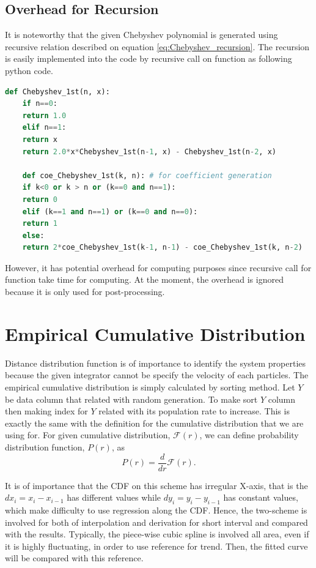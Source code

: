 \documentclass[10pt, a4paper]{article}
\begin{document}
\begin{appendices}
  \subsection{Overhead for Recursion}
  It is noteworthy that the given Chebyshev polynomial is generated using recursive relation described on equation \eqref{eq:Chebyshev_recursion}. The recursion is easily implemented into the code by recursive call on function as following python code.

  \begin{lstlisting}[language=Python, frame=single]
    def Chebyshev_1st(n, x): 
    if n==0:
    return 1.0
    elif n==1:
    return x
    return 2.0*x*Chebyshev_1st(n-1, x) - Chebyshev_1st(n-2, x)

    def coe_Chebyshev_1st(k, n): # for coefficient generation
    if k<0 or k > n or (k==0 and n==1):
    return 0
    elif (k==1 and n==1) or (k==0 and n==0):
    return 1
    else:
    return 2*coe_Chebyshev_1st(k-1, n-1) - coe_Chebyshev_1st(k, n-2)
  \end{lstlisting}

  However, it has potential overhead for computing purposes since recursive call for function take time for computing. At the moment, the overhead is ignored because it is only used for post-processing. 


  \section{Empirical Cumulative Distribution}\label{appen_distance_distribution}
  Distance distribution function is of importance to identify the system properties because the given integrator cannot be specify the velocity of each particles. The empirical cumulative distribution is simply calculated by sorting method. Let $Y$ be data column that related with random generation. To make sort $Y$ column then making index for $Y$ related with its population rate to increase. This is exactly the same with the definition for the cumulative distribution that we are using for. For given cumulative distribution, $\mathscr{F}(r)$, we can define probability distribution function, $P(r)$, as
  \begin{equation}
    P(r) = \frac{d}{dr}\mathscr{F}(r).
  \end{equation}

  It is of importance that the CDF on this scheme has irregular X-axis, that is the $dx_i = x_i - x_{i-1}$ has different values while $dy_i = y_i - y_{i-1}$ has constant values, which make difficulty to use regression along the CDF. Hence, the two-scheme is involved for both of interpolation and derivation for short interval and compared with the results. Typically, the piece-wise cubic spline is involved all area, even if it is highly fluctuating, in order to use reference for trend. Then, the fitted curve will be compared with this reference.


\end{appendices}
\end{document}
